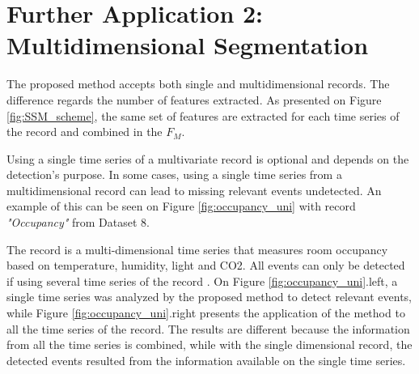 \section{Further Application 2: Multidimensional Segmentation}

The proposed method accepts both single and multidimensional records. The difference regards the number of features extracted. As presented on Figure \ref{fig:SSM_scheme}, the same set of features are extracted for each time series of the record and combined in the $F_M$. 
\par
Using a single time series of a multivariate record is optional and depends on the detection's purpose. In some cases, using a single time series from a multidimensional record can lead to missing relevant events undetected. An example of this can be seen on Figure \ref{fig:occupancy_uni} with record \textit{"Occupancy"} from Dataset 8. 
\par
The record is a multi-dimensional time series that measures room occupancy based on temperature, humidity, light and CO2. All events can only be detected if using several time series of the record \cite{cpd_alan}. On Figure \ref{fig:occupancy_uni}.left, a single time series was analyzed by the proposed method to detect relevant events, while Figure \ref{fig:occupancy_uni}.right presents the application of the method to all the time series of the record. The results are different because the information from all the time series is combined, while with the single dimensional record, the detected events resulted from the information available on the single time series.\\






